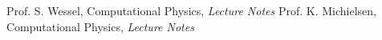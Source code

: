 \documentclass[journal]{IEEEtran} %
\begin{document}
\newpage
\onecolumn




\begin{thebibliography}{10}\footnotesize

 Prof. S. Wessel, Computational Physics, {\it Lecture Notes}
 Prof. K. Michielsen, Computational Physics, {\it Lecture Notes}

\end{thebibliography}


%
%
\end{document}
